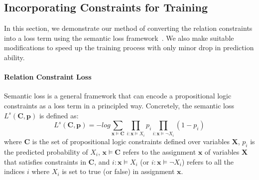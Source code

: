 \subsection{Incorporating  Constraints for Training}
\label{sec:loss_term}
In this section, we demonstrate our method of converting the relation constraints into a loss term using the semantic loss framework~\cite{xu2017semantic}.
We also make suitable modifications to speed up the training process with only minor drop in prediction ability.

\paragraph{Relation Constraint Loss}
Semantic loss is a general framework that can encode a propositional logic constraints as a loss term in a principled way.
Concretely, the semantic loss $L^{s}(\bm{C}, \bm{p})$ is defined as:
\begin{equation}
\label{seq:semantic_loss}
	L^{s}(\bm{C}, \bm{p}) = -log\sum\limits_{\bm x\models\bm{C}}\prod\limits_{i:\bm x\models X_i}p_i\prod\limits_{i:\bm x\models \neg X_i}(1-p_i)
\end{equation}
where $\bm{C}$ is the set of propositional logic constraints defined over variables $\bm{X}$,
$p_i$ is the predicted probability of $X_i$,
$\bm x \models \bm{C}$ refers to the assignment $\bm x$ of variables $\bm X$ that satisfies constraints in $\bm{C}$,
and $i:\bm x \models X_i$ (or $i:\bm x\models \neg X_i$) refers to all the indices $i$ where $X_i$ is set to true (or false) in assignment $\bm x$.

